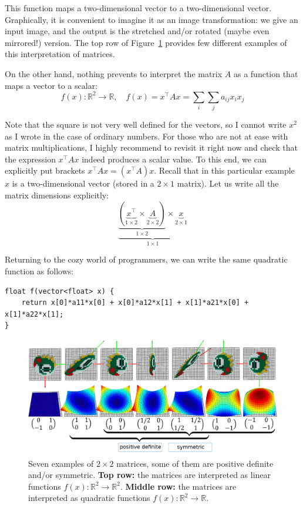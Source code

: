 \documentclass[notitlepage]{report}
\begin{document}
This function maps a two-dimensional vector to a two-dimensional vector.
Graphically, it is convenient to imagine it as an image transformation: we give an input image, and the output is the stretched and/or rotated (maybe even mirrored!) version.
The top row of Figure~\ref{fig:matrices} provides few different examples of this interpretation of matrices.

On the other hand, nothing prevents to interpret the matrix $A$ as a function that maps a vector to a scalar:
$$
f(x) : \mathbb R^2 \rightarrow \mathbb R, \quad f(x) = x^\top A x = \sum\limits_i\sum\limits_j a_{ij}x_i x_j
$$

Note that the square is not very well defined for the vectors, so I cannot write $x^2$ as I wrote in the case of ordinary numbers. 
For those who are not at ease with matrix multiplications, I highly recommend to revisit it right now and check that the expression $x^\top A x$ indeed produces a scalar value.
To this end, we can explicitly put brackets $x^\top A x = (x^\top A) x$.
Recall that in this particular example $x$ is a two-dimensional vector (stored in a $2\times 1$ matrix).
Let us write all the matrix dimensions explicitly:
$$
\underbrace{\underbrace{\left(\underbrace{x^\top}_{1\times 2} \times \underbrace{A}_{2\times 2}\right)}_{1\times 2} \times \underbrace{x}_{2\times 1}}_{1 \times 1}
$$

Returning to the cozy world of programmers, we can write the same quadratic function as follows:
\begin{verbatim}
float f(vector<float> x) {
    return x[0]*a11*x[0] + x[0]*a12*x[1] + x[1]*a21*x[0] + x[1]*a22*x[1];
}
\end{verbatim}

\begin{figure}[ht]
	\centering
	\includegraphics[width=\linewidth]{matrices}
	\caption{Seven examples of $2\times 2$ matrices, some of them are positive definite and/or symmetric. 
    \textbf{Top row:} the matrices are interpreted as linear functions $f(x):\mathbb R^2 \rightarrow \mathbb R^2$. \textbf{Middle row:} the matrices are interpreted as quadratic functions
 $f(x):\mathbb R^2 \rightarrow \mathbb R$.}
	\label{fig:matrices}
\end{figure}
\end{document}
